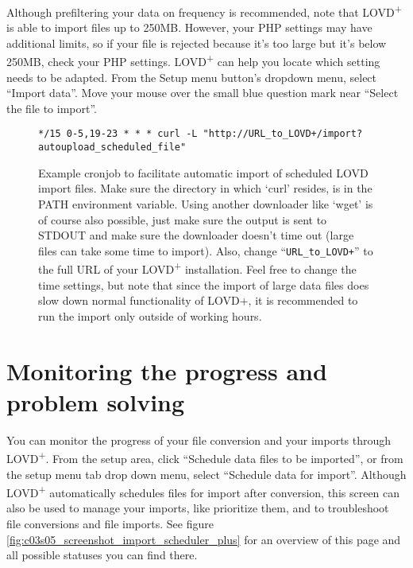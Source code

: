 \begin{infotable}
Although prefiltering your data on frequency is recommended, note that LOVD\textsuperscript{+}
 is able to import files up to 250MB.
However, your PHP settings may have additional limits, so if your file is rejected
 because it's too large but it's below 250MB, check your PHP settings.
LOVD\textsuperscript{+} can help you locate which setting needs to be adapted.
From the Setup menu button's dropdown menu, select ``Import data''.
Move your mouse over the small blue question mark near ``Select the file to import''.
\end{infotable}

\begin{figure}[ht]
  \begin{shaded}
  \small
\begin{verbatim}
*/15 0-5,19-23 * * * curl -L "http://URL_to_LOVD+/import?autoupload_scheduled_file"
\end{verbatim}
  \caption{%
    Example cronjob to facilitate automatic import of scheduled LOVD import files.
    Make sure the directory in which `curl' resides, is in the PATH environment variable.
    Using another downloader like `wget' is of course also possible, just make sure the output is sent to STDOUT and
     make sure the downloader doesn't time out (large files can take some time to import).
    Also, change ``\texttt{URL\_to\_LOVD+}'' to the full URL of your LOVD\textsuperscript{+} installation.
    Feel free to change the time settings, but note that since the import of large data files does slow down normal
     functionality of LOVD+, it is recommended to run the import only outside of working hours.}
    \label{fig:import_import_cronjob}
  \end{shaded}
\end{figure}





\section{Monitoring the progress and problem solving}
\label{sec:import_monitoring}
You can monitor the progress of your file conversion and your imports through LOVD\textsuperscript{+}.
From the setup area, click ``Schedule data files to be imported'',
 or from the setup menu tab drop down menu, select ``Schedule data for import''.
Although LOVD\textsuperscript{+} automatically schedules files for import after conversion, this screen can also be
 used to manage your imports, like prioritize them, and to troubleshoot file conversions and file imports.
See figure \ref{fig:c03s05_screenshot_import_scheduler_plus}
 for an overview of this page and all possible statuses you can find there.

